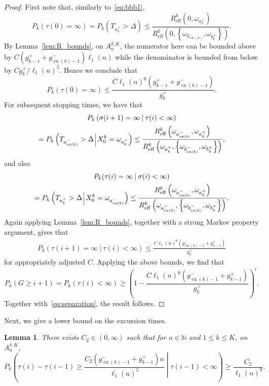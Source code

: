 \documentclass[10pt]{amsart}
\newtheorem{lemm}[theo]{Lemma}\newtheorem{prop}[theo]{Proposition}\newtheorem{coro}[theo]{Corollary}\newtheorem{conj}[theo]{Conjecture}
\theoremstyle{definition}\newtheorem{defi}[theo]{Definition}\newtheorem{rema}[theo]{Remark}\newtheorem{exam}[theo]{Example}\newtheorem{exem}[theo]{Example}\newtheorem{nota}[theo]{Notation}
\newcommand{\N}{\mathbb N}
\newcommand{\eff}{\mathrm{eff}}
\newcommand{\relmiddle}[1]{\mathrel{}\middle#1\mathrel{}}
\newcommand{\cond}{\relmiddle{|}}
\newcommand{\Pk}{{P_k}}
\newcommand\ex{\operatorname{ex}}
\newcommand{\aat}[1]{a_{\ex(#1)}^-}
\newcommand{\bt}[1]{b_{\ex(#1)}^-}
\newcommand{\gtt}[1]{g_{\ex(#1)-1}^-}
\begin{document}
\begin{proof}
First note that, similarly to~\eqref{eq:bbb1},
\[
\Pk(\tau(0)=\infty)=\Pk\left(T_{a_k^+}>\Delta\right)\leq
\frac{{R}^k_\eff\left(0,\omega_{a_k^+}\right)}{{R}^k_\eff\left(0,\left\{\omega_{\bt{k}},\omega_{{b}_k^+}\right\}\right)}.
\]
By Lemma~\ref{lem:R_bounds}, on $A_n^{\delta,K}$, the numerator here can be bounded above by $C(g_{k-1}^++\gtt{k})\ell_1(n)$ while the denominator is bounded from below by $Cg_k^+/\ell_1(n)^5$. Hence we conclude that
\begin{equation}\label{taubound}
\Pk(\tau(0)=\infty)\leq \frac{C\ell_1(n)^6\left(g_{k-1}^++\gtt{k}\right)}{g_{k}^+}.
\end{equation}
For subsequent stopping times, we have that
\begin{multline*}
\Pk\left(\sigma(i+1)=\infty\:\middle|\:\tau(i)<\infty\right)\\
=\Pk\left(T_{\aat{k}}>\Delta\:\vline\:X^k_0=\omega_{a_k^+}\right)\leq\frac{{R}^k_\eff\left(\omega_{\aat{k}},\omega_{a_k^+}\right)}{{R}^k_\eff\left(\omega_{a_k^+},
\left\{\omega_{\bt{k}},\omega_{{b}_k^+}\right\}\right)},
\end{multline*}
and also
\begin{multline*}
\Pk(\tau(i)=\infty\:|\:\sigma(i)<\infty)\\
=\Pk
\left(T_{{a}_k^+}>\Delta\:\vline\:X^k_0=\omega_{\aat{k}}\right)\leq
\frac{{R}^k_\eff\left(\omega_{\aat{k}},\omega_{a_k^+}\right)}{{R}^k_\eff\left(\omega_{\aat{k}},
\left\{\omega_{\bt{k}},\omega_{{b}_k^+}\right\}\right)}.
\end{multline*}
Again applying Lemma~\ref{lem:R_bounds}, together with a strong Markov property argument, gives that
\[
\begin{split}
\Pk(\tau(i+1)=\infty\:|\:\tau(i)<\infty)\leq \frac{C\ell_1(n)^6\left(\gtt{k}+g_{k-1}^+\right)}{{g_{k}^+}}
\end{split}
\]
for appropriately adjusted $C$. Applying the above bounds, we find that
\[
\Pk\left(G\geq i+1\right)=\Pk\left(\tau(i)<\infty\right)\geq \left(1- \frac{C\ell_1(n)^6\left(\gtt{k}+g_{k-1}^+\right)}{{g_{k}^+}}\right)^i.
\]
Together with~\eqref{eq:separation}, the result follows.
\end{proof}

Next, we give a lower bound on the excursion times.

\begin{lemm}\label{lem:exc}
There exists $C_2\in (0,\infty)$ such that for $n\in\N$ and $1\leq k\leq K$, on $A_n^{\delta,K}$,
\[
\Pk\left(\tau(i)-\tau(i-1)\geq \frac{C_2\left(\gtt{k}+g_{k-1}^+\right)n}{ \ell_1(n)^{5}}\cond\tau(i-1)<\infty\right)\geq \frac{C_2}{\ell_1(n)^{8}}.
\]
\end{lemm}
\end{document}
